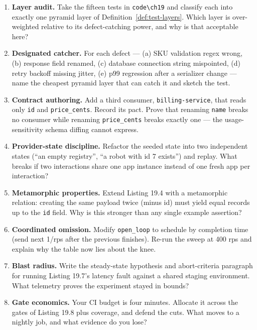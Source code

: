 \begin{enumerate}[label=\textbf{E-\arabic*.}, leftmargin=1.9cm]
  \item \textbf{Layer audit.} Take the fifteen tests in
        \texttt{code\textbackslash{}ch19} and classify each into exactly
        one pyramid layer of Definition~\ref{def:test-layers}. Which layer
        is over-weighted relative to its defect-catching power, and why is
        that acceptable here?
  \item \textbf{Designated catcher.} For each defect --- (a) SKU validation
        regex wrong, (b) response field renamed, (c) database connection
        string mispointed, (d) retry backoff missing jitter, (e) p99
        regression after a serializer change --- name the cheapest pyramid
        layer that can catch it and sketch the test.
  \item \textbf{Contract authoring.} Add a third consumer,
        \texttt{billing-service}, that reads only \texttt{id} and
        \texttt{price\_cents}. Record its pact. Prove that renaming
        \texttt{name} breaks no consumer while renaming
        \texttt{price\_cents} breaks exactly one --- the usage-sensitivity
        schema diffing cannot express.
  \item \textbf{Provider-state discipline.} Refactor the seeded state into
        two independent states (``an empty registry'', ``a robot with id 7
        exists'') and replay. What breaks if two interactions share one
        app instance instead of one fresh app per interaction?
  \item \textbf{Metamorphic properties.} Extend Listing 19.4 with a
        metamorphic relation: creating the same payload twice (minus
        id) must yield equal records up to the \texttt{id} field. Why is
        this stronger than any single example assertion?
  \item \textbf{Coordinated omission.} Modify \texttt{open\_loop} to
        schedule by completion time (send next 1/rps after the previous
        finishes). Re-run the sweep at 400 rps and explain why the table
        now lies about the knee.
  \item \textbf{Blast radius.} Write the steady-state hypothesis and
        abort-criteria paragraph for running Listing 19.7's latency fault
        against a shared staging environment. What telemetry proves the
        experiment stayed in bounds?
  \item \textbf{Gate economics.} Your CI budget is four minutes. Allocate
        it across the gates of Listing 19.8 plus coverage, and defend the
        cuts. What moves to a nightly job, and what evidence do you lose?
\end{enumerate}

